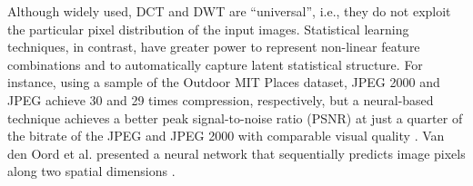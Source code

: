 \documentclass[smallabstract,smallcaptions]{dccpaper}
\begin{document}
Although widely used, DCT and DWT are ``universal'', i.e., they do not exploit the particular pixel distribution of the input images. Statistical learning techniques, in contrast, have greater power to represent non-linear feature combinations and to automatically capture latent statistical structure. %
For instance, using a sample of the Outdoor MIT Places dataset, JPEG 2000 and JPEG achieve 30 and 29 times compression, respectively, but a neural-based technique achieves a better peak signal-to-noise ratio (PSNR) at just a quarter of the bitrate of the JPEG and JPEG 2000 with comparable visual quality \cite{toderici2016full}. Van den Oord et al. presented a neural network that sequentially predicts image pixels along two spatial dimensions \cite{oord2016pixel}. 
\end{document}

